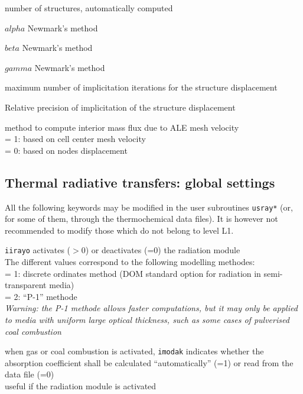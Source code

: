 {number of structures, automatically computed}

{$alpha$ Newmark's method}

{$beta$ Newmark's method}

{$gamma$ Newmark's method}

{maximum number of implicitation iterations for the structure displacement}

{Relative precision of implicitation of the structure displacement }

{method to compute interior mass flux due to ALE mesh velocity\\
\hspace*{1.3cm} = 1: based on cell center mesh velocity\\
\hspace*{1.3cm} = 0: based on nodes displacement
}
\subsection{Thermal radiative transfers: global settings}

All the following keywords may be modified in the user subroutines
\texttt{usray*} (or, for some of them, through the thermochemical data files).
It is however not recommended to modify those which do not belong to
level L1.

{{\tt iirayo} activates ($>0$) or deactivates
(=0) the radiation module\\
The different values correspond to the following modelling methodes:\\
\hspace*{1.3cm} = 1: discrete ordinates method
(DOM standard option for radiation in semi-transparent media)\\
\hspace*{1.3cm} = 2: ``P-1'' methode\\
{\em Warning: the P-1 methode allows faster computations, but it
may only be applied to media with uniform large optical thickness, such as
some cases of pulverised coal combustion}}

{when gas or coal combustion is activated, {\tt imodak} indicates whether the
absorption coefficient shall be calculated ``automatically'' (=1) or read from
the data file (=0)\\
useful if the radiation module is activated}

